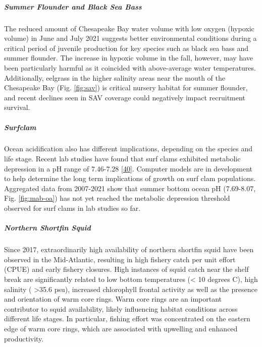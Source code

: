 \documentclass[
  10pt,
]{article}
\begin{document}
\hypertarget{summer-flounder-and-black-sea-bass}{%
\subparagraph{\texorpdfstring{\emph{Summer Flounder and Black Sea
Bass}}{Summer Flounder and Black Sea Bass}}\label{summer-flounder-and-black-sea-bass}}

The reduced amount of Chesapeake Bay water volume with low oxygen
(hypoxic volume) in June and July 2021 suggests better environmental
conditions during a critical period of juvenile production for key
species such as black sea bass and summer flounder. The increase in
hypoxic volume in the fall, however, may have been particularly harmful
as it coincided with above-average water temperatures. Additionally,
eelgrass in the higher salinity areas near the mouth of the Chesapeake
Bay (Fig. \ref{fig:sav}) is critical nursery habitat for summer
flounder, and recent declines seen in SAV coverage could negatively
impact recruitment survival.

\hypertarget{surfclam}{%
\subparagraph{\texorpdfstring{\emph{Surfclam}}{Surfclam}}\label{surfclam}}

Ocean acidification also has different implications, depending on the
species and life stage. Recent lab studies have found that surf clams
exhibited metabolic depression in a pH range of 7.46-7.28
{[}\protect\hyperlink{ref-pousse_energetic_2020}{40}{]}. Computer models
are in development to help determine the long term implications of
growth on surf clam populations. Aggregated data from 2007-2021 show
that summer bottom ocean pH (7.69-8.07, Fig. \ref{fig:mab-oa}) has not
yet reached the metabolic depression threshold observed for surf clams
in lab studies so far.

\hypertarget{northern-shortfin-squid}{%
\subparagraph{\texorpdfstring{\emph{Northern Shortfin
Squid}}{Northern Shortfin Squid}}\label{northern-shortfin-squid}}

Since 2017, extraordinarily high availability of northern shortfin squid
have been observed in the Mid-Atlantic, resulting in high fishery catch
per unit effort (CPUE) and early fishery closures. High instances of
squid catch near the shelf break are significantly related to low bottom
temperatures (\textless{} 10 degrees C), high salinity (
\textgreater35.6 psu), increased chlorophyll frontal activity as well as
the presence and orientation of warm core rings. Warm core rings are an
important contributor to squid availability, likely influencing habitat
conditions across different life stages. In particular, fishing effort
was concentrated on the eastern edge of warm core rings, which are
associated with upwelling and enhanced productivity.
\end{document}
